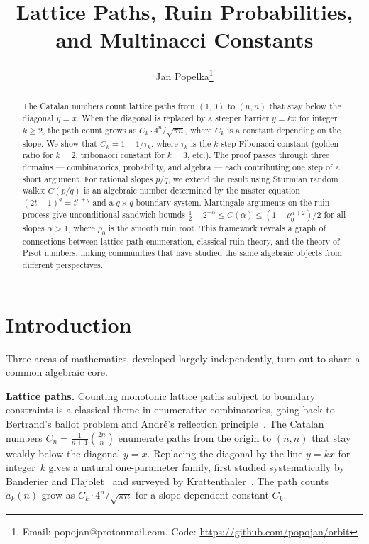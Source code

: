 \documentclass[11pt]{article}
\title{Lattice Paths, Ruin Probabilities, and Multinacci Constants}
\author{Jan Popelka\thanks{Email: popojan@protonmail.com. Code: \url{https://github.com/popojan/orbit}}}
\date{}
\theoremstyle{definition}
\theoremstyle{remark}
\begin{document}
\maketitle

\begin{abstract}
The Catalan numbers count lattice paths from $(1,0)$ to $(n,n)$ that stay
below the diagonal $y = x$.
When the diagonal is replaced by a steeper barrier $y = kx$ for integer
$k \geq 2$, the path count grows as $C_k \cdot 4^n / \sqrt{\pi n}$,
where $C_k$ is a constant depending on the slope.
We show that $C_k = 1 - 1/\tau_k$, where $\tau_k$ is the $k$-step
Fibonacci constant (golden ratio for $k = 2$, tribonacci constant for
$k = 3$, etc.).
The proof passes through three domains --- combinatorics, probability,
and algebra --- each contributing one step of a short argument.
For rational slopes $p/q$, we extend the result using
Sturmian random walks: $C(p/q)$ is an algebraic number determined by
the master equation $(2t-1)^q = t^{p+q}$ and a $q \times q$ boundary
system.
Martingale arguments on the ruin process give unconditional sandwich
bounds $\tfrac{1}{2} - 2^{-\alpha} \leq C(\alpha) \leq
(1 - \rho_0^{\alpha+2})/2$ for all slopes $\alpha > 1$, where
$\rho_0$ is the smooth ruin root.
This framework reveals a graph of connections between lattice path
enumeration, classical ruin theory, and the theory of Pisot numbers,
linking communities that have studied the same algebraic objects
from different perspectives.
\end{abstract}

\section{Introduction}\label{sec:intro}

Three areas of mathematics, developed largely independently, turn out
to share a common algebraic core.

\medskip\noindent\textbf{Lattice paths.}
Counting monotonic lattice paths subject to boundary constraints is a
classical theme in enumerative combinatorics, going back to
Bertrand's ballot problem and Andr\'e's reflection
principle~\cite{Andre1887}.
The Catalan numbers $C_n = \frac{1}{n+1}\binom{2n}{n}$ enumerate paths
from the origin to $(n,n)$ that stay weakly below the diagonal $y = x$.
Replacing the diagonal by the line $y = kx$ for integer~$k$ gives a
natural one-parameter family, first studied systematically by
Banderier and Flajolet~\cite{BanderierFlajolet2002} and surveyed by
Krattenthaler~\cite{Krattenthaler2015}.
The path counts $a_k(n)$ grow as $C_k \cdot 4^n / \sqrt{\pi n}$
for a slope-dependent constant $C_k$.
\end{document}
